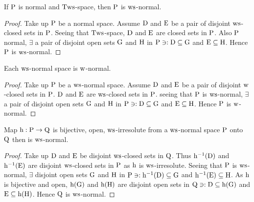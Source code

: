 \begin{thm}\label{thm8.4.6}
If $\mathrm{P}$ is normal and $\mathrm{T}\mathrm{ws}$-space, then $\mathrm{P}$ is $\mathrm{ws}$-normal.
\end{thm}

\begin{proof}
Take up $\mathrm{P}$ be a normal space. Assume $\mathrm{D}$ and $\mathrm{E}$ be a pair of disjoint $\mathrm{ws}$-closed sets in $\mathrm{P}$. Seeing that $\mathrm{T}\mathrm{ws}$-space, $\mathrm{D}$ and $\mathrm{E}$ are closed sets in $\mathrm{P}$. Also $\mathrm{P}$ normal, $\exists$ a pair of disjoint open sets $\mathrm{G}$ and $\mathrm{H}$ in $\mathrm{P} \ni: \mathrm{D} \subseteq \mathrm{G}$ and $\mathrm{E} \subseteq \mathrm{H}$. Hence $\mathrm{P}$ is $\mathrm{ws}$-normal.
\end{proof}

\begin{thm}\label{thm8.4.7}
Each $\mathrm{ws}$-normal space is $\mathrm{w}$-normal.
\end{thm}

\begin{proof}
Take up $\mathrm{P}$ be a $\mathrm{ws}$-normal space. Assume $\mathrm{D}$ and $\mathrm{E}$ be a pair of disjoint $\mathrm{w}$-closed sets in $\mathrm{P}$. $\mathrm{D}$ and $\mathrm{E}$ are $\mathrm{ws}$-closed sets in $\mathrm{P}$. seeing that $\mathrm{P}$ is $\mathrm{ws}$-normal, $\exists$ a pair of disjoint open sets $\mathrm{G}$ and $\mathrm{H}$ in $\mathrm{P} \ni: \mathrm{D} \subseteq \mathrm{G}$ and $\mathrm{E} \subseteq \mathrm{H}$. Hence $\mathrm{P}$ is $\mathrm{w}$-normal.
\end{proof}

\begin{thm}\label{thm8.4.8} 
Map $\mathrm{h}: \mathrm{P} \to \mathrm{Q}$ is bijective, open, $\mathrm{ws}$-irresolute from a $\mathrm{ws}$-normal space $\mathrm{P}$ onto $\mathrm{Q}$ then is $\mathrm{ws}$-normal.
\end{thm}

\begin{proof}
Take up $\mathrm{D}$ and $\mathrm{E}$ be disjoint $\mathrm{ws}$-closed sets in $\mathrm{Q}$. Thus $\mathrm{h}^{-1} (\mathrm{D})$ and $\mathrm{h}^{-1} (\mathrm{E})$ are disjoint $\mathrm{ws}$-closed sets in $\mathrm{P}$ as $\mathrm{h}$ is $\mathrm{ws}$-irresolute. Seeing that $\mathrm{P}$ is $\mathrm{ws}$-normal, $\exists$ disjoint open sets $\mathrm{G}$ and $\mathrm{H}$ in $\mathrm{P} \ni: \mathrm{h}^{-1} (\mathrm{D}) \subseteq \mathrm{G}$ and $\mathrm{h}^{-1} (\mathrm{E}) \subseteq \mathrm{H}$. As $\mathrm{h}$ is bijective and open, $\mathrm{h}(\mathrm{G})$ and $\mathrm{h}(\mathrm{H})$ are disjoint open sets in $\mathrm{Q} \ni: \mathrm{D} \subseteq \mathrm{h}(\mathrm{G})$ and $\mathrm{E} \subseteq \mathrm{h}(\mathrm{H})$. Hence $\mathrm{Q}$ is $\mathrm{ws}$-normal.
\end{proof}

